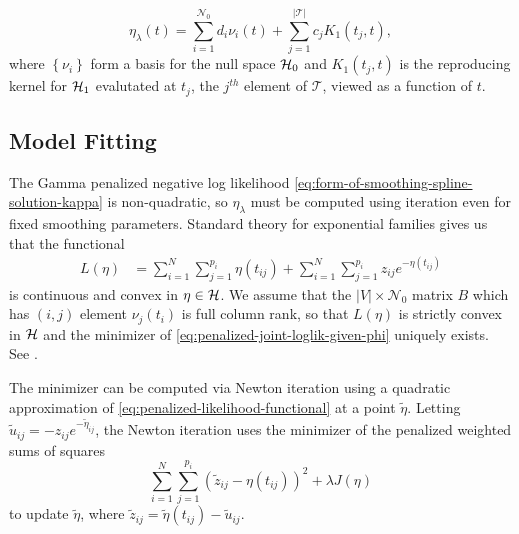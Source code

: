\begin{equation} \label{eq:form-of-smoothing-spline-solution-kappa}
\eta_\lambda\left( t \right) = \sum_{i = 1}^{\mathcal{N}_0} d_i \nu_i\left( t \right) + \sum_{j = 1}^{\vert \mathcal{T} \vert} c_j K_1\left(t_j,t\right),
\end{equation}  
\noindent
where $\left\{\nu_i \right\}$ form a basis for the null space $\mathcal{H}_0$ and $K_1\left(t_j,t\right)$ is the reproducing kernel for $\mathcal{H}_1$ evalutated at ${t_j}$, the $j^{th}$ element of $\mathcal{T}$, viewed as a function of $t$.


\subsection{Model Fitting}

The Gamma penalized negative log likelihood \eqref{eq:form-of-smoothing-spline-solution-kappa} is non-quadratic, so $\eta_\lambda$ must be computed using iteration even for fixed smoothing parameters. Standard theory for exponential families gives us that the functional 
\begin{align}  \label{eq:penalized-likelihood-functional}
L\left( \eta \right) &= \sum_{i = 1}^N \sum_{j = 1}^{p_i} \eta\left(t_{ij}\right)  + \sum_{i = 1}^N \sum_{j = 1}^{p_i} z_{ij} e^{-\eta\left(t_{ij}\right)} 
\end{align}
\noindent
is continuous and convex in $\eta \in \mathcal{H}$. We assume that the $\vert V \vert \times \mathcal{N}_0$ matrix $B$ which has $\left(i,j\right)$ element $\nu_j\left(t_i\right)$ is full column rank, so that $L\left(\eta \right)$ is strictly convex in $\mathcal{H}$ and the minimizer of \eqref{eq:penalized-joint-loglik-given-phi} uniquely exists. See \cite{wahba1995smoothing}. 

\bigskip

The minimizer can be computed via Newton iteration using a quadratic approximation of \eqref{eq:penalized-likelihood-functional} at a point $\tilde{\eta}$. Letting $\tilde{u}_{ij} = -z_{ij}e^{-\tilde{\eta}_{ij}}$, the Newton iteration uses the minimizer of the penalized weighted sums of squares
\begin{equation} \label{eq:penalized-weighted-sums-of-squares}
\sum_{i=1}^N\sum_{j=1}^{p_i} \left(\tilde{z}_{ij} - \eta\left(t_{ij}\right)  \right)^2 + \lambda J\left(\eta\right)
\end{equation}
\noindent
to update $\tilde{\eta}$, where $\tilde{z}_{ij} = \tilde{\eta}\left(t_{ij}\right) - \tilde{u}_{ij}$.



